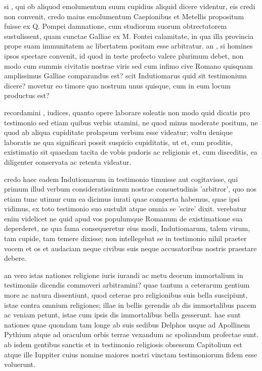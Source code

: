  si , qui ob aliquod emolumentum suum cupidius aliquid dicere videntur, eis credi non convenit, credo maius emolumentum Caepionibus et Metellis propositum fuisse ex Q. Pompei damnatione, cum studiorum suorum obtrectatorem sustulissent, quam cunctae Galliae ex M. Fontei calamitate, in qua illa provincia prope suam immunitatem ac libertatem positam esse arbitratur. an , si homines ipsos spectare convenit, id quod in teste profecto valere plurimum debet, non modo cum summis civitatis nostrae viris sed cum infimo cive Romano quisquam amplissimus Galliae comparandus est? scit Indutiomarus quid sit testimonium dicere? movetur eo timore quo nostrum unus quisque, cum in eum locum productus est?

 recordamini , iudices, quanto opere laborare soleatis non modo quid dicatis pro testimonio sed etiam quibus verbis utamini, ne quod minus moderate positum, ne quod ab aliqua cupiditate prolapsum verbum esse videatur; voltu denique laboratis ne qua significari possit suspicio cupiditatis, ut et, cum proditis, existimatio sit quaedam tacita de vobis pudoris ac religionis et, cum disceditis, ea diligenter conservata ac retenta videatur.

 credo haec eadem Indutiomarum in testimonio timuisse aut cogitavisse, qui primum illud verbum consideratissimum nostrae consuetudinis 'arbitror', quo nos etiam tunc utimur cum ea dicimus iurati quae comperta habemus, quae ipsi vidimus, ex toto testimonio suo sustulit atque omnia se 'scire' dixit. verebatur enim videlicet ne quid apud vos populumque Romanum de existimatione sua deperderet, ne qua fama consequeretur eius modi, Indutiomarum, talem virum, tam cupide, tam temere dixisse; non intellegebat se in testimonio nihil praeter vocem et os et audaciam neque civibus suis neque accusatoribus nostris praestare debere.

 an vero istas nationes religione iuris iurandi ac metu deorum immortalium in testimoniis dicendis commoveri arbitramini? quae tantum a ceterarum gentium more ac natura dissentiunt, quod ceterae pro religionibus suis bella suscipiunt, istae contra omnium religiones; illae in bellis gerendis ab dis immortalibus pacem ac veniam petunt, istae cum ipsis dis immortalibus bella gesserunt. hae sunt nationes quae quondam tam longe ab suis sedibus Delphos usque ad Apollinem Pythium atque ad oraculum orbis terrae vexandum ac spoliandum profectae sunt. ab isdem gentibus sanctis et in testimonio religiosis obsessum Capitolium est atque ille Iuppiter cuius nomine maiores nostri vinctam testimoniorum fidem esse voluerunt.

